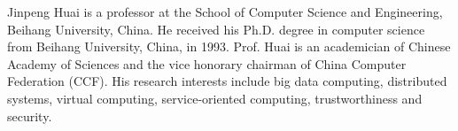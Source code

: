 \begin{IEEEbiography}{Jinpeng Huai} is a professor at the School of Computer Science and Engineering, Beihang University, China. He received his Ph.D. degree in computer science from Beihang University, China, in 1993. Prof. Huai is an academician of Chinese Academy of Sciences and the vice honorary chairman of China Computer Federation (CCF). His research interests include big data computing, distributed systems, virtual computing, service-oriented computing, trustworthiness and security.
\end{IEEEbiography}
